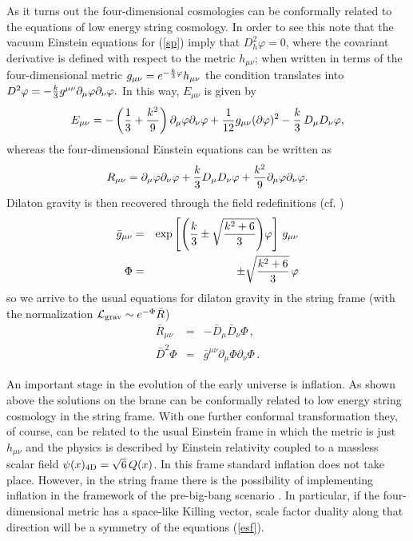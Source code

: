 \documentclass[prd,a4paper,twocolumn,superscriptaddress,nofootinbib,showpacs]{revtex4}
\def\CL{{\cal L}} \def\CH{{\cal H}} \def\CI{{\cal I}} \def\CU{{\cal U}}
\begin{document}
As it turns out the four-dimensional cosmologies can be conformally related to the
equations of low energy string cosmology. In order to see this 
note that the vacuum Einstein equations for (\ref{sp}) imply that
$D^{2}_{h}\varphi=0$, where the covariant derivative is defined 
with respect to the metric $h_{\mu\nu}$; when written 
in terms of the four-dimensional metric $g_{\mu\nu}=e^{-{k\over 3}\varphi}h_{\mu\nu}$
the condition translates into
$D^2\varphi=-{k\over3}g^{\mu\nu} \partial_{\mu}\varphi\partial_{\nu}\varphi.$ 
In this way, $E_{\mu\nu}$ is given by
$$
E_{\mu\nu}=-\left({1\over3}+{k^2\over9}\right)
\partial_{\mu}\varphi\partial_{\nu}\varphi+
{1\over12}g_{\mu\nu}
(\partial\varphi)^2
-{k\over3}\,D_{\mu}D_{\nu}\varphi,$$
whereas the four-dimensional Einstein equations can be written as
$$R_{\mu\nu}=\partial_{\mu}\varphi\partial_{\nu}\varphi+{k\over3}
D_{\mu}D_{\nu}\varphi+{k^2\over9}\partial_{\mu}
\varphi\partial_{\nu}\varphi.
$$
Dilaton gravity is then recovered through the field redefinitions (cf. \cite{jim}) 
\begin{eqnarray}
\bar{g}_{\mu\nu}&=&\exp\left[{\left({k\over 3}\pm\sqrt{{k^2+6\over 3}}\right)}\varphi\right]
\,g_{\mu\nu} \nonumber \\
\Phi &=& \pm \sqrt{{k^2+6\over 3}}\,\varphi
\end{eqnarray}
so we arrive to the usual equations for dilaton gravity in the string frame (with the normalization 
$\CL_{\rm grav}\sim e^{-\Phi}\bar{R}$)
\begin{eqnarray}
\bar{R}_{\mu\nu}&=&-\bar{D}_{\mu}\bar{D}_{\nu}\Phi\, , \nonumber \\
\bar{D}^2\Phi &=& \bar{g}^{\mu\nu}\partial_{\mu}\Phi\partial_{\nu}\Phi\, .
\label{esf}
\end{eqnarray}

An important stage in the evolution of the early universe is 
inflation. 
As shown above the solutions on the brane can be conformally related
to low energy string cosmology in the string frame. With one
further conformal transformation they, of course, can be
related to the usual Einstein frame in which the metric is just $h_{\mu\nu}$ and
the physics is described by Einstein relativity coupled to a massless
scalar field $\psi(x)_{\rm 4D}=\sqrt{6}\,Q(x)$. In this frame standard inflation
does not take place. However, in the string frame there is
the possibility of implementing inflation in the framework
of the pre-big-bang scenario \cite{gab}. In particular, if the four-dimensional
metric has a space-like Killing vector, scale factor duality along that direction
will be a symmetry of the equations (\ref{esf}). 
\end{document}
